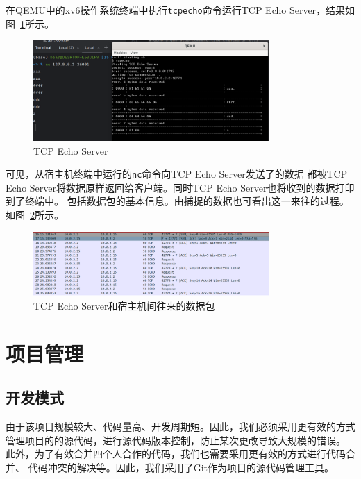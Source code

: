 \documentclass[a4paper,twoside]{ctexrep}
\begin{document}
\begin{spacing}{1.2}
在QEMU中的xv6操作系统终端中执行\texttt{tcpecho}命令运行TCP Echo Server，结果如图~\ref{fig:tcpecho}所示。
\begin{figure}[htb]
	\centering
	\caption{TCP Echo Server}
	\label{fig:tcpecho}
	\includegraphics[width=0.8\textwidth]{tcpecho.png}
\end{figure}
可见，从宿主机终端中运行的\texttt{nc}命令向TCP Echo Server发送了的数据
都被TCP Echo Server将数据原样返回给客户端。同时TCP Echo Server也将收到的数据打印到了终端中。
包括数据包的基本信息。由捕捉的数据也可看出这一来往的过程。如图~\ref{fig:tcpechopack}所示。
\begin{figure}[htb]
	\centering
	\caption{TCP Echo Server和宿主机间往来的数据包}
	\label{fig:tcpechopack}
	\includegraphics[width=0.8\textwidth]{tcpechopack.png}
\end{figure}



\chapter{项目管理}

\section{开发模式}

由于该项目规模较大、代码量高、开发周期短。因此，我们必须采用更有效的方式
管理项目的的源代码，进行源代码版本控制，防止某次更改导致大规模的错误。
此外，为了有效合并四个人合作的代码，我们也需要采用更有效的方式进行代码合并、
代码冲突的解决等。因此，我们采用了Git作为项目的源代码管理工具。


\end{spacing}
\end{document}
